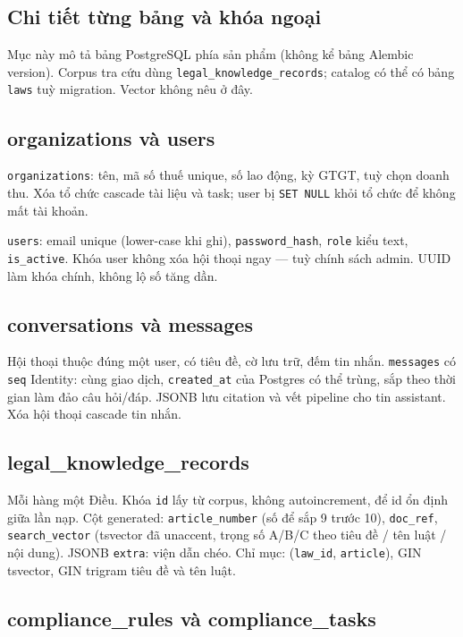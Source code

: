 \subsection{Chi tiết từng bảng và khóa ngoại}

Mục này mô tả bảng PostgreSQL phía sản phẩm (không kể bảng Alembic version).
Corpus tra cứu dùng \texttt{legal\_knowledge\_records}; catalog có thể có bảng
\texttt{laws} tuỳ migration. Vector không nêu ở đây.

\subsection{organizations và users}

\texttt{organizations}: tên, mã số thuế unique, số lao động, kỳ GTGT, tuỳ chọn
doanh thu. Xóa tổ chức cascade tài liệu và task; user bị \texttt{SET NULL} khỏi
tổ chức để không mất tài khoản.

\texttt{users}: email unique (lower-case khi ghi), \texttt{password\_hash},
\texttt{role} kiểu text, \texttt{is\_active}. Khóa user không xóa hội thoại ngay
--- tuỳ chính sách admin. UUID làm khóa chính, không lộ số tăng dần.

\subsection{conversations và messages}

Hội thoại thuộc đúng một user, có tiêu đề, cờ lưu trữ, đếm tin nhắn.
\texttt{messages} có \texttt{seq} Identity: cùng giao dịch, \texttt{created\_at}
của Postgres có thể trùng, sắp theo thời gian làm đảo câu hỏi/đáp. JSONB lưu
citation và vết pipeline cho tin assistant. Xóa hội thoại cascade tin nhắn.

\subsection{legal\_knowledge\_records}

Mỗi hàng một Điều. Khóa \texttt{id} lấy từ corpus, không autoincrement, để id
ổn định giữa lần nạp. Cột generated: \texttt{article\_number} (số để sắp 9 trước
10), \texttt{doc\_ref}, \texttt{search\_vector} (tsvector đã unaccent, trọng số
A/B/C theo tiêu đề / tên luật / nội dung). JSONB \texttt{extra}: viện dẫn chéo.
Chỉ mục: (\texttt{law\_id}, \texttt{article}), GIN tsvector, GIN trigram tiêu đề
và tên luật.

\subsection{compliance\_rules và compliance\_tasks}

